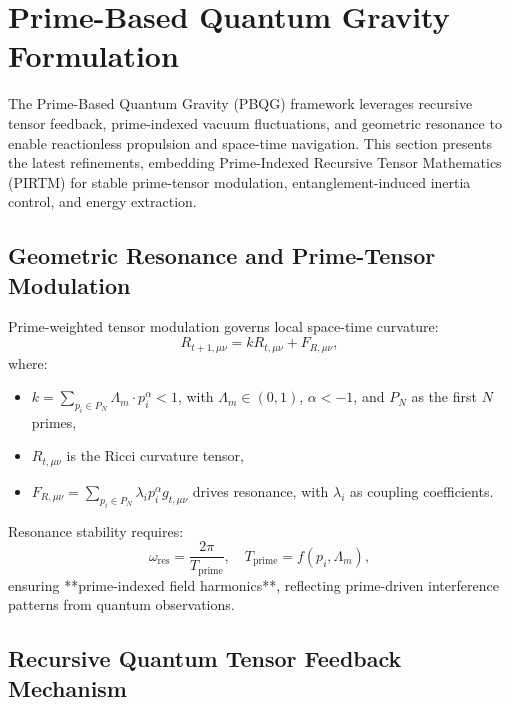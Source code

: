 \documentclass{article}
\theoremstyle{plain}
\begin{document}
\section{Prime-Based Quantum Gravity Formulation}
\label{sec:quantum_gravity}

The Prime-Based Quantum Gravity (PBQG) framework leverages recursive tensor feedback, prime-indexed vacuum fluctuations, and geometric resonance to enable reactionless propulsion and space-time navigation. This section presents the latest refinements, embedding Prime-Indexed Recursive Tensor Mathematics (PIRTM) for stable prime-tensor modulation, entanglement-induced inertia control, and energy extraction.

\subsection{Geometric Resonance and Prime-Tensor Modulation}
\label{subsec:geometric_resonance}

Prime-weighted tensor modulation governs local space-time curvature:
\begin{equation}
    R_{t+1,\mu\nu} = k R_{t,\mu\nu} + F_{R,\mu\nu},
\end{equation}
where:
\begin{itemize}
    \item \( k = \sum_{p_i \in P_N} \Lambda_m \cdot p_i^\alpha < 1 \), with \( \Lambda_m \in (0, 1) \), \( \alpha < -1 \), and \( P_N \) as the first \( N \) primes,
    \item \( R_{t,\mu\nu} \) is the Ricci curvature tensor,
    \item \( F_{R,\mu\nu} = \sum_{p_i \in P_N} \lambda_i p_i^\alpha g_{t,\mu\nu} \) drives resonance, with \( \lambda_i \) as coupling coefficients.
\end{itemize}
Resonance stability requires:
\begin{equation}
    \omega_{\text{res}} = \frac{2\pi}{T_{\text{prime}}}, \quad T_{\text{prime}} = f(p_i, \Lambda_m),
\end{equation}
ensuring **prime-indexed field harmonics**, reflecting prime-driven interference patterns from quantum observations.

\subsection{Recursive Quantum Tensor Feedback Mechanism}
\label{subsec:tensor_feedback}
\end{document}
